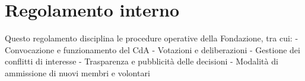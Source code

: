 
\section*{Regolamento interno}

Questo regolamento disciplina le procedure operative della Fondazione, tra cui:
- Convocazione e funzionamento del CdA
- Votazioni e deliberazioni
- Gestione dei conflitti di interesse
- Trasparenza e pubblicità delle decisioni
- Modalità di ammissione di nuovi membri e volontari

